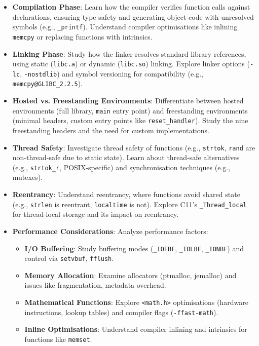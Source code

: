 \documentclass[a4paper,12pt]{article}
\begin{document}
\begin{itemize}[noitemsep]
    \item \textbf{Compilation Phase}: Learn how the compiler verifies function calls against declarations, ensuring type safety and generating object code with unresolved symbols (e.g., \texttt{\_printf}). Understand compiler optimisations like inlining \texttt{memcpy} or replacing functions with intrinsics.

    \item \textbf{Linking Phase}: Study how the linker resolves standard library references, using static (\texttt{libc.a}) or dynamic (\texttt{libc.so}) linking. Explore linker options (\texttt{-lc}, \texttt{-nostdlib}) and symbol versioning for compatibility (e.g., \texttt{memcpy@GLIBC\_2.2.5}).

    \item \textbf{Hosted vs. Freestanding Environments}: Differentiate between hosted environments (full library, \texttt{main} entry point) and freestanding environments (minimal headers, custom entry points like \texttt{reset\_handler}). Study the nine freestanding headers and the need for custom implementations.

    \item \textbf{Thread Safety}: Investigate thread safety of functions (e.g., \texttt{strtok}, \texttt{rand} are non-thread-safe due to static state). Learn about thread-safe alternatives (e.g., \texttt{strtok\_r}, POSIX-specific) and synchronisation techniques (e.g., mutexes).

    \item \textbf{Reentrancy}: Understand reentrancy, where functions avoid shared state (e.g., \texttt{strlen} is reentrant, \texttt{localtime} is not). Explore C11’s \texttt{\_Thread\_local} for thread-local storage and its impact on reentrancy.

    \item \textbf{Performance Considerations}: Analyze performance factors:
    \begin{itemize}
        \item \textbf{I/O Buffering}: Study buffering modes (\texttt{\_IOFBF}, \texttt{\_IOLBF}, \texttt{\_IONBF}) and control via \texttt{setvbuf}, \texttt{fflush}.
        \item \textbf{Memory Allocation}: Examine allocators (ptmalloc, jemalloc) and issues like fragmentation, metadata overhead.
        \item \textbf{Mathematical Functions}: Explore \texttt{<math.h>} optimisations (hardware instructions, lookup tables) and compiler flags (\texttt{-ffast-math}).
        \item \textbf{Inline Optimisations}: Understand compiler inlining and intrinsics for functions like \texttt{memset}.
    \end{itemize}


\end{itemize}
\end{document}

